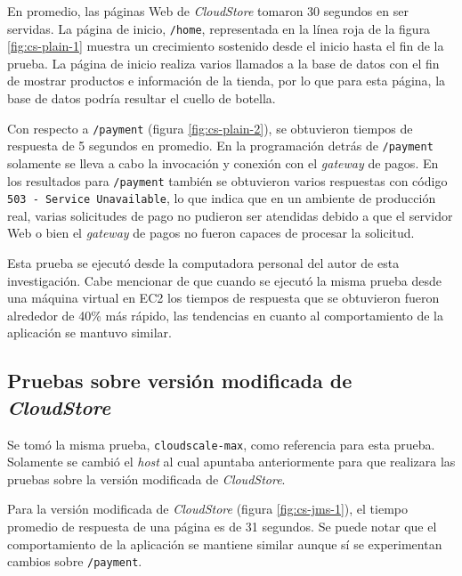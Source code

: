 \documentclass[11pt, twoside]{report}
\begin{document}
En promedio, las páginas Web de \emph{CloudStore} tomaron 30 segundos en ser servidas. La página de inicio, \texttt{/home}, representada en la línea roja de la figura \ref{fig:cs-plain-1} muestra un crecimiento sostenido desde el inicio hasta el fin de la prueba. La página de inicio realiza varios llamados a la base de datos con el fin de mostrar productos e información de la tienda, por lo que para esta página, la base de datos podría resultar el cuello de botella.

Con respecto a \texttt{/payment} (figura \ref{fig:cs-plain-2}), se obtuvieron tiempos de respuesta de 5 segundos en promedio. En la programación detrás de \texttt{/payment} solamente se lleva a cabo la invocación y conexión con el \emph{gateway} de pagos. En los resultados para \texttt{/payment} también se obtuvieron varios respuestas con código \texttt{503 - Service Unavailable}, lo que indica que en un ambiente de producción real, varias solicitudes de pago no pudieron ser atendidas debido a que el servidor Web o bien el \emph{gateway} de pagos no fueron capaces de procesar la solicitud.

Esta prueba se ejecutó desde la computadora personal del autor de esta investigación. Cabe mencionar de que cuando se ejecutó la misma prueba desde una máquina virtual en EC2 los tiempos de respuesta que se obtuvieron fueron alrededor de 40\% más rápido, las tendencias en cuanto al comportamiento de la aplicación se mantuvo similar.

\subsection{Pruebas sobre versión modificada de \emph{CloudStore}}
Se tomó la misma prueba, \texttt{cloudscale-max}, como referencia para esta prueba. Solamente se cambió el \emph{host} al cual apuntaba anteriormente para que realizara las pruebas sobre la versión modificada de \emph{CloudStore}.

Para la versión modificada de \emph{CloudStore} (figura \ref{fig:cs-jms-1}), el tiempo promedio de respuesta de una página es de 31 segundos. Se puede notar que el comportamiento de la aplicación se mantiene similar aunque sí se experimentan cambios sobre \texttt{/payment}.
\end{document}
